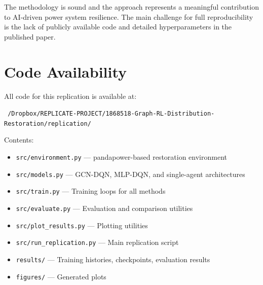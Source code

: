 \documentclass[11pt]{article}
\begin{document}
The methodology is sound and the approach represents a meaningful contribution to AI-driven power system resilience. The main challenge for full reproducibility is the lack of publicly available code and detailed hyperparameters in the published paper.

\section*{Code Availability}

All code for this replication is available at:

\noindent\texttt{~/Dropbox/REPLICATE-PROJECT/1868518-Graph-RL-Distribution-Restoration/replication/}

\noindent Contents:
\begin{itemize}[leftmargin=*]
    \item \texttt{src/environment.py} --- pandapower-based restoration environment
    \item \texttt{src/models.py} --- GCN-DQN, MLP-DQN, and single-agent architectures
    \item \texttt{src/train.py} --- Training loops for all methods
    \item \texttt{src/evaluate.py} --- Evaluation and comparison utilities
    \item \texttt{src/plot\_results.py} --- Plotting utilities
    \item \texttt{src/run\_replication.py} --- Main replication script
    \item \texttt{results/} --- Training histories, checkpoints, evaluation results
    \item \texttt{figures/} --- Generated plots
\end{itemize}
\end{document}
